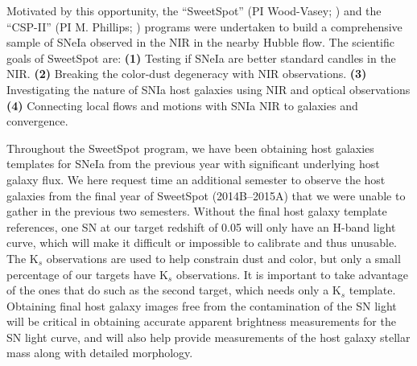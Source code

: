 \documentclass[11pt]{article}
\begin{document}
Motivated by this opportunity, the ``SweetSpot'' (PI Wood-Vasey; \cite{weyant11}) and the ``CSP-II'' (PI M. Phillips; \cite{contreras10,stritzinger11}) programs were undertaken to build a comprehensive sample of SNeIa observed in the NIR in the nearby Hubble flow.
The scientific goals of SweetSpot are:
{\bf (1)}
Testing if SNeIa are better standard candles in the NIR.
{\bf (2)}
Breaking the color-dust degeneracy with NIR observations.
{\bf (3)}
Investigating the nature of SNIa host galaxies using NIR and optical observations
{\bf (4)}
Connecting local flows and motions with SNIa NIR to galaxies and convergence.

Throughout the SweetSpot program, we have been obtaining host galaxies templates for SNeIa from the previous year with significant underlying host galaxy flux.   
We here request time an additional semester to observe the host galaxies from the final year of SweetSpot (2014B--2015A) that we were unable to gather in the previous two semesters.  
Without the final host galaxy template references, 
one SN at our target redshift of 0.05 will only have an H-band light curve, which will make it difficult or impossible to calibrate and thus unusable. 
The K$_s$ observations are used to help constrain dust and color, but only a small percentage of our targets have K$_s$ observations.  
It is important to take advantage of the ones that do such as the second target, which needs only a K$_s$ template. 
Obtaining final host galaxy images free from the contamination of the SN light will be critical in obtaining accurate apparent brightness measurements for the SN light curve, and will also help provide measurements of the host galaxy stellar mass along with detailed morphology.


\end{document}
